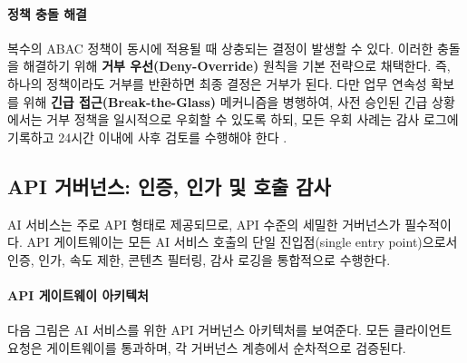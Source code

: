 \paragraph{정책 충돌 해결}

복수의 ABAC 정책이 동시에 적용될 때 상충되는 결정이 발생할 수 있다. 이러한 충돌을 해결하기 위해 \textbf{거부 우선(Deny-Override)} 원칙을 기본 전략으로 채택한다. 즉, 하나의 정책이라도 거부를 반환하면 최종 결정은 거부가 된다. 다만 업무 연속성 확보를 위해 \textbf{긴급 접근(Break-the-Glass)} 메커니즘을 병행하여, 사전 승인된 긴급 상황에서는 거부 정책을 일시적으로 우회할 수 있도록 하되, 모든 우회 사례는 감사 로그에 기록하고 24시간 이내에 사후 검토를 수행해야 한다 \cite{ammanath2022trustworthy}.

\subsection{API 거버넌스: 인증, 인가 및 호출 감사}
\label{sec:15.3.2}

AI 서비스는 주로 API 형태로 제공되므로, API 수준의 세밀한 거버넌스가 필수적이다. API 게이트웨이는 모든 AI 서비스 호출의 단일 진입점(single entry point)으로서 인증, 인가, 속도 제한, 콘텐츠 필터링, 감사 로깅을 통합적으로 수행한다.

\paragraph{API 게이트웨이 아키텍처}

다음 그림은 AI 서비스를 위한 API 거버넌스 아키텍처를 보여준다. 모든 클라이언트 요청은 게이트웨이를 통과하며, 각 거버넌스 계층에서 순차적으로 검증된다.

